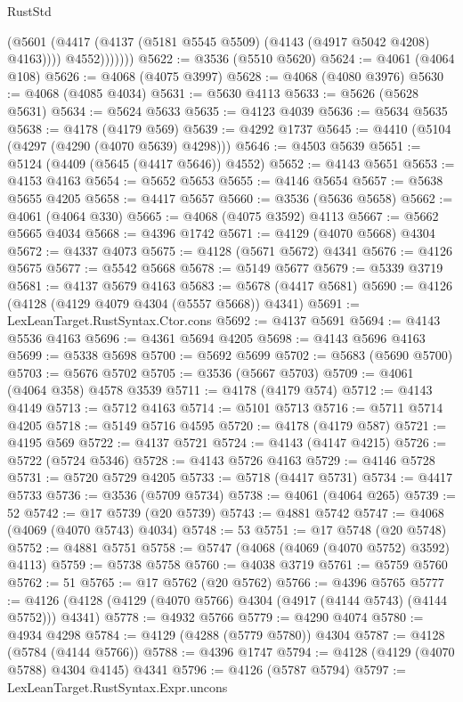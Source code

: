 \begin{lexlean}{RustStd}
\begin{coremodule}
                  (@5601 (@4417 (@4137 (@5181 @5545 @5509) (@4143 (@4917 @5042 @4208) @4163))))
                  @4552)))))))
@5622 := @3536 (@5510 @5620)
@5624 := @4061 (@4064 @108)
@5626 := @4068 (@4075 @3997)
@5628 := @4068 (@4080 @3976)
@5630 := @4068 (@4085 @4034)
@5631 := @5630 @4113
@5633 := @5626 (@5628 @5631)
@5634 := @5624 @5633
@5635 := @4123 @4039
@5636 := @5634 @5635
@5638 := @4178 (@4179 @569)
@5639 := @4292 @1737
@5645 := @4410 (@5104 (@4297 (@4290 (@4070 @5639) @4298)))
@5646 := @4503 @5639
@5651 := @5124 (@4409 (@5645 (@4417 @5646)) @4552)
@5652 := @4143 @5651
@5653 := @4153 @4163
@5654 := @5652 @5653
@5655 := @4146 @5654
@5657 := @5638 @5655 @4205
@5658 := @4417 @5657
@5660 := @3536 (@5636 @5658)
@5662 := @4061 (@4064 @330)
@5665 := @4068 (@4075 @3592) @4113
@5667 := @5662 @5665 @4034
@5668 := @4396 @1742
@5671 := @4129 (@4070 @5668) @4304
@5672 := @4337 @4073
@5675 := @4128 (@5671 @5672) @4341
@5676 := @4126 @5675
@5677 := @5542 @5668
@5678 := @5149 @5677
@5679 := @5339 @3719
@5681 := @4137 @5679 @4163
@5683 := @5678 (@4417 @5681)
@5690 := @4126 (@4128 (@4129 @4079 @4304 (@5557 @5668)) @4341)
@5691 := LexLeanTarget.RustSyntax.Ctor.cons
@5692 := @4137 @5691
@5694 := @4143 @5536 @4163
@5696 := @4361 @5694 @4205
@5698 := @4143 @5696 @4163
@5699 := @5338 @5698
@5700 := @5692 @5699
@5702 := @5683 (@5690 @5700)
@5703 := @5676 @5702
@5705 := @3536 (@5667 @5703)
@5709 := @4061 (@4064 @358) @4578 @3539
@5711 := @4178 (@4179 @574)
@5712 := @4143 @4149
@5713 := @5712 @4163
@5714 := @5101 @5713
@5716 := @5711 @5714 @4205
@5718 := @5149 @5716 @4595
@5720 := @4178 (@4179 @587)
@5721 := @4195 @569
@5722 := @4137 @5721
@5724 := @4143 (@4147 @4215)
@5726 := @5722 (@5724 @5346)
@5728 := @4143 @5726 @4163
@5729 := @4146 @5728
@5731 := @5720 @5729 @4205
@5733 := @5718 (@4417 @5731)
@5734 := @4417 @5733
@5736 := @3536 (@5709 @5734)
@5738 := @4061 (@4064 @265)
@5739 := 52
@5742 := @17 @5739 (@20 @5739)
@5743 := @4881 @5742
@5747 := @4068 (@4069 (@4070 @5743) @4034)
@5748 := 53
@5751 := @17 @5748 (@20 @5748)
@5752 := @4881 @5751
@5758 := @5747 (@4068 (@4069 (@4070 @5752) @3592) @4113)
@5759 := @5738 @5758
@5760 := @4038 @3719
@5761 := @5759 @5760
@5762 := 51
@5765 := @17 @5762 (@20 @5762)
@5766 := @4396 @5765
@5777 := @4126 (@4128 (@4129 (@4070 @5766) @4304 (@4917 (@4144 @5743) (@4144 @5752))) @4341)
@5778 := @4932 @5766
@5779 := @4290 @4074
@5780 := @4934 @4298
@5784 := @4129 (@4288 (@5779 @5780)) @4304
@5787 := @4128 (@5784 (@4144 @5766))
@5788 := @4396 @1747
@5794 := @4128 (@4129 (@4070 @5788) @4304 @4145) @4341
@5796 := @4126 (@5787 @5794)
@5797 := LexLeanTarget.RustSyntax.Expr.uncons

\end{coremodule}
\end{lexlean}
